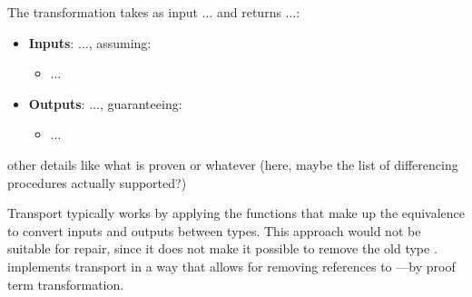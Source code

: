 The transformation takes as input $\ldots$ and returns $\ldots$:

\begin{itemize}
\item \textbf{Inputs}: $\ldots$, assuming:
\begin{itemize}
\item $\ldots$
\end{itemize}
\item \textbf{Outputs}: $\ldots$, guaranteeing:
\begin{itemize}
\item $\ldots$
\end{itemize}
\end{itemize}

other details like what is proven or whatever (here, maybe the list of differencing procedures actually supported?)

Transport typically works by applying the functions that make up the equivalence to convert
inputs and outputs between types.
This approach would not be suitable for repair, since it does not make it possible to remove the old type \Aa.
\toolnamec implements transport in a way that allows for removing references to \Aa---by proof term transformation.



